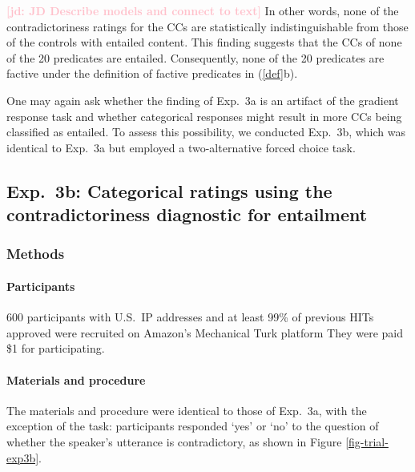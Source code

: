 \documentclass[11pt,fleqn]{article}
\newcommand{\jd}[1]{\textbf{\textcolor{Pink}{[jd: #1]}}}
\newcommand{\6}{\mbox{$[\hspace*{-.6mm}[$}}
\newcommand{\9}{\mbox{$]\hspace*{-.6mm}]$}}
\begin{document}
{\jd{JD Describe models and connect to text} In other words, none of the contradictoriness ratings for the CCs are statistically indistinguishable from those of the controls with entailed content. This finding suggests that the CCs of none of the 20 predicates are entailed. Consequently, none of the 20 predicates are factive under the definition of factive predicates in (\ref{def}b). 

One may again ask whether the finding of Exp.~3a is an artifact of the gradient response task and whether categorical responses might result in more CCs being classified as entailed. To assess this possibility, we conducted Exp.~3b, which was identical to Exp.~3a but employed a two-alternative forced choice task.



\subsection{Exp.~3b: Categorical ratings using the contradictoriness diagnostic for entailment}\label{s32}

\subsubsection{Methods}

\paragraph{Participants} 600 participants with U.S.\ IP addresses and at least 99\% of previous HITs approved were recruited on Amazon's Mechanical Turk platform They were paid \$1 for participating.

\paragraph{Materials and procedure} The materials and procedure were identical to those of Exp.~3a, with the exception of the task: participants responded `yes' or `no' to the question of whether the speaker's utterance is contradictory, as shown in Figure \ref{fig-trial-exp3b}.

}
\end{document}
